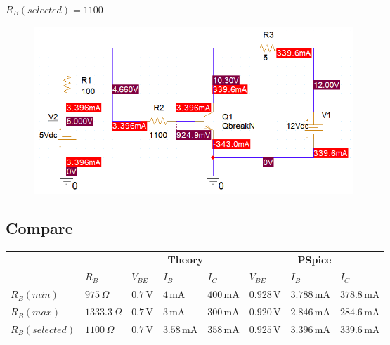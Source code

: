 $R_B (selected) = 1100$
\begin{figure}[h]
    \centering
    \includegraphics[width=12cm]{graphics/ex4/f4.PNG}
\end{figure}
\subsection{Compare}

\begin{center}
    \begin{tabular}{l|l|l|l|l|l|l|l|}
    \cline{2-8}
                                     & & \multicolumn{3}{c|}{\textbf{Theory}} & \multicolumn{3}{c|}{\textbf{PSpice}} \\ \cline{2-8} 
                                     &$R_B$ & $V_{BE}$              & $I_B$              & $I_C$              & $V_{BE}$              & $I_B$              & $I_C$             \\ \hline
     \multicolumn{1}{|l|}{$R_B(min)$} &\( 975 \, \Omega \) & \( 0.7 \, \text{V} \) & \( 4 \, \text{mA} \) & \( 400 \, \text{mA} \) & \( 0.928 \, \text{V} \) & \( 3.788 \, \text{mA} \) & \( 378.8 \, \text{mA} \) \\ \hline
    \multicolumn{1}{|l|}{$R_B(max)$}  &\( 1333.3 \, \Omega \) & \( 0.7 \, \text{V} \) & \( 3 \, \text{mA} \) & \( 300 \, \text{mA} \) & \( 0.920 \, \text{V} \) & \( 2.846 \, \text{mA} \) & \( 284.6 \, \text{mA} \) \\ \hline
        \multicolumn{1}{|l|}{$R_B(selected)$}  &\( 1100 \, \Omega \) & \( 0.7 \, \text{V} \) & \( 3.58 \, \text{mA} \) & \( 358 \, \text{mA} \) & \( 0.925 \, \text{V} \) & \( 3.396 \, \text{mA} \) & \( 339.6 \, \text{mA} \) \\ \hline

    \end{tabular}
\end{center}